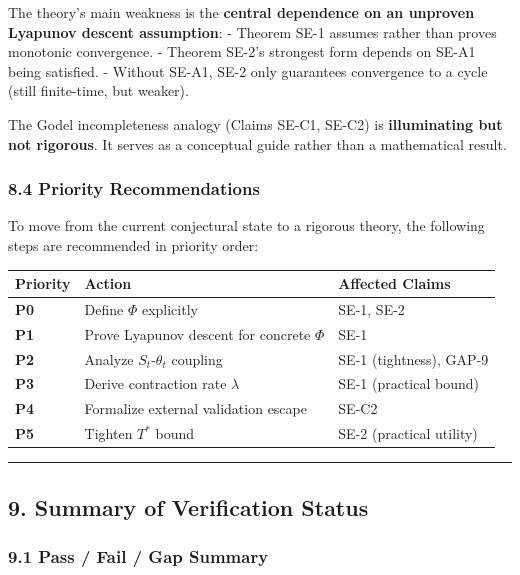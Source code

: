 \documentclass[
  12pt,
]{ctexart}
\begin{document}
The theory's main weakness is the \textbf{central dependence on an
unproven Lyapunov descent assumption}: - Theorem SE-1 assumes rather
than proves monotonic convergence. - Theorem SE-2's strongest form
depends on SE-A1 being satisfied. - Without SE-A1, SE-2 only guarantees
convergence to a cycle (still finite-time, but weaker).

The Godel incompleteness analogy (Claims SE-C1, SE-C2) is
\textbf{illuminating but not rigorous}. It serves as a conceptual guide
rather than a mathematical result.

\subsubsection{8.4 Priority
Recommendations}\label{priority-recommendations}

To move from the current conjectural state to a rigorous theory, the
following steps are recommended in priority order:

\begin{longtable}[]{@{}lll@{}}
\toprule\noalign{}
Priority & Action & Affected Claims \\
\midrule\noalign{}
\endhead
\bottomrule\noalign{}
\endlastfoot
\textbf{P0} & Define \(\Phi\) explicitly & SE-1, SE-2 \\
\textbf{P1} & Prove Lyapunov descent for concrete \(\Phi\) & SE-1 \\
\textbf{P2} & Analyze \(S_t\)-\(\theta_t\) coupling & SE-1 (tightness),
GAP-9 \\
\textbf{P3} & Derive contraction rate \(\lambda\) & SE-1 (practical
bound) \\
\textbf{P4} & Formalize external validation escape & SE-C2 \\
\textbf{P5} & Tighten \(T^*\) bound & SE-2 (practical utility) \\
\end{longtable}

\begin{center}\rule{0.5\linewidth}{0.5pt}\end{center}

\subsection{9. Summary of Verification
Status}\label{summary-of-verification-status}

\subsubsection{9.1 Pass / Fail / Gap
Summary}\label{pass-fail-gap-summary}
\end{document}
